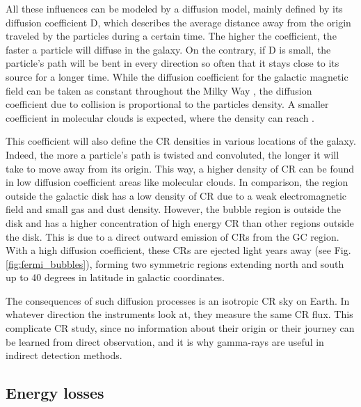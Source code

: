  All these influences can be modeled by a diffusion model, mainly defined by its diffusion coefficient D, which describes the average distance away from the origin traveled by the particles during a certain time. The higher the coefficient, the faster a particle will diffuse in the galaxy. On the contrary, if D is small, the particle's path will be bent in every direction so often that it stays close to its source for a longer time. 
While the diffusion coefficient for the galactic magnetic field can be taken as constant throughout the Milky Way \cite{Farrar2012}, the diffusion coefficient due to collision is proportional to the particles density. A smaller coefficient in molecular clouds is expected, where the density can reach . \cite{Crutcher2012}

This coefficient will also define the CR densities in various locations of the galaxy. Indeed, the more a particle's path is twisted and convoluted, the longer it will take to move away from its origin. This way, a higher density of CR can be found in low diffusion coefficient areas like molecular clouds. In comparison, the region outside the galactic disk has a low density of CR due to a weak electromagnetic field and small gas and dust density.
However, the bubble region is outside the disk and has a higher concentration of high energy CR than other regions outside the disk. This is due to a direct outward emission of CRs from the GC region. With a high diffusion coefficient, these CRs are ejected light years away (see Fig. \ref{fig:fermi_bubbles}), forming two symmetric regions extending north and south up to 40 degrees in latitude in galactic coordinates.\cite{Ackermann2014}

The consequences of such diffusion processes is an isotropic CR sky on Earth. In whatever direction the instruments look at, they measure the same CR flux. This complicate CR study, since no information about their origin or their journey can be learned from direct observation, and it is why gamma-rays are useful in indirect detection methods.

\subsection{Energy losses}

